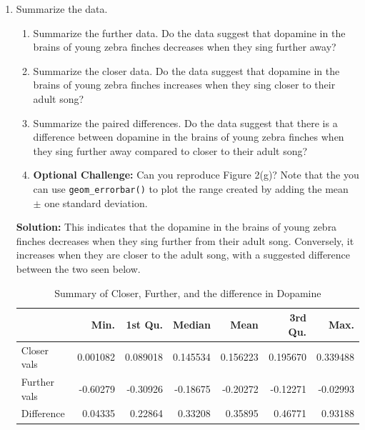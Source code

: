 \documentclass{article}\usepackage[]{graphicx}\usepackage[]{xcolor}
\makeatletter
\newcommand{\hlsng}[1]{\textcolor[rgb]{0.192,0.494,0.8}{#1}}%
\newcommand{\hlopt}[1]{\textcolor[rgb]{0,0,0}{#1}}%
\newcommand{\hldef}[1]{\textcolor[rgb]{0.345,0.345,0.345}{#1}}%
\newcommand{\hlkwb}[1]{\textcolor[rgb]{0.69,0.353,0.396}{#1}}%
\newcommand{\hlkwc}[1]{\textcolor[rgb]{0.333,0.667,0.333}{#1}}%
\newcommand{\hlkwd}[1]{\textcolor[rgb]{0.737,0.353,0.396}{\textbf{#1}}}%
\newenvironment{kframe}{%
 \def\at@end@of@kframe{}%
 \ifinner\ifhmode%
  \def\at@end@of@kframe{\end{minipage}}%
  \begin{minipage}{\columnwidth}%
 \fi\fi%
 \def\FrameCommand##1{\hskip\@totalleftmargin \hskip-\fboxsep
 \colorbox{shadecolor}{##1}\hskip-\fboxsep
     \hskip-\linewidth \hskip-\@totalleftmargin \hskip\columnwidth}%
 \MakeFramed {\advance\hsize-\width
   \@totalleftmargin\z@ \linewidth\hsize
   \@setminipage}}%
 {\par\unskip\endMakeFramed%
 \at@end@of@kframe}
\newenvironment{knitrout}{}{} %
\makeatother
\begin{document}
\begin{enumerate}
\textbf{Solution:} To collect the data, we downloaded all of their Figure 2 data, went to the g tabs, then saved just the closer\_vals and further\_vals as a separate .csv file to easily use in our code. This was done by simply copying and pasting the two columns together. Mutating the data we also got the difference by subtracting between the two.
\begin{knitrout}\scriptsize
{}\color{fgcolor}\begin{kframe}
\begin{alltt}
\hldef{finch.data} \hlkwb{=} \hlkwd{read.csv}\hldef{(}\hlsng{"./41586_2025_8729_MOESM4_ESM.csv"}\hldef{) |>}
  \hlkwd{mutate}\hldef{(}\hlkwc{difference} \hldef{= Closer_vals} \hlopt{-} \hldef{Farther_vals)}
\end{alltt}
\end{kframe}
\end{knitrout}
\item Summarize the data.
\begin{enumerate}
  \item Summarize the further data. Do the data suggest that
   dopamine in the brains of young zebra finches decreases when
   they sing further away?
   \item Summarize the closer data. Do the data suggest that
   dopamine in the brains of young zebra finches increases when
   they sing closer to their adult song?
  \item Summarize the paired differences. Do the data suggest
  that there is a difference between dopamine in the brains of
  young zebra finches when they sing further away compared to 
  closer to their adult song?
  \item \textbf{Optional Challenge:} Can you reproduce Figure 2(g)?
  Note that the you can use \texttt{geom\_errorbar()} to plot
  the range created by adding the mean $\pm$ one standard deviation.
\end{enumerate}

\textbf{Solution:}
This indicates that the dopamine in the brains of young zebra finches decreases when they sing further from their adult song. Conversely, it increases when they are closer to the adult song, with a suggested difference between the two seen below. 
\begin{table}[ht]
\centering
\caption{Summary of Closer, Further, and the difference in Dopamine}
\begin{tabular}{|l|r|r|r|r|r|r|}
\hline
 & Min. & 1st Qu. & Median & Mean & 3rd Qu. & Max. \\
\hline
Closer vals & 0.001082 & 0.089018 & 0.145534 & 0.156223 & 0.195670 & 0.339488 \\
Further vals & -0.60279 & -0.30926 & -0.18675 & -0.20272 & -0.12271 & -0.02993 \\
Difference & 0.04335 & 0.22864 & 0.33208 & 0.35895 & 0.46771 & 0.93188 \\
\hline
\end{tabular}
\end{table}



\end{enumerate}
\end{document}
